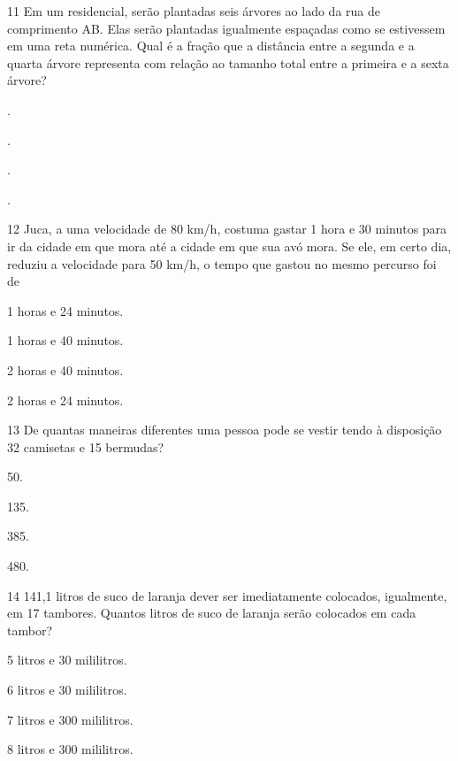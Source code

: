\begin{mdframed}[linewidth=2pt,linecolor=salmao,roundcorner=2pt]
\begin{escolha}
{\begin{escolha}
\num{11} Em um residencial, serão plantadas seis árvores ao lado da rua de comprimento AB. Elas
serão plantadas igualmente espaçadas como se estivessem em uma reta numérica.
Qual é a fração que a distância entre a segunda e a quarta árvore
representa com relação ao tamanho total entre a primeira e a sexta árvore?

\begin{escolha}
\item
  .
\item
  .
\item
  .
\item
  .
\end{escolha}


\num{12} Juca, a uma velocidade de 80 km/h, costuma gastar 1 hora e 30 minutos
para ir da cidade em que mora até a cidade em que sua avó mora. Se ele,
em certo dia, reduziu a velocidade para 50 km/h, o tempo que gastou no mesmo percurso foi de

\begin{escolha}
\item
  1 horas e 24 minutos.
\item
  1 horas e 40 minutos.
\item
  2 horas e 40 minutos.
\item
  2 horas e 24 minutos.
\end{escolha}


\num{13} De quantas maneiras diferentes uma pessoa pode se vestir tendo à
disposição 32 camisetas e 15 bermudas?

\begin{escolha}
\item
  50.
\item
  135.
\item
  385.
\item
  480.
\end{escolha}


\num{14} 141,1 litros de suco de laranja dever ser imediatamente colocados,
igualmente, em 17 tambores. Quantos litros de suco de laranja serão
colocados em cada tambor?

\begin{escolha}
\item
  5 litros e 30 mililitros.
\item
  6 litros e 30 mililitros.
\item
  7 litros e 300 mililitros.
\item
  8 litros e 300 mililitros.
\end{escolha}




\end{escolha}}
\end{escolha}
\end{mdframed}
